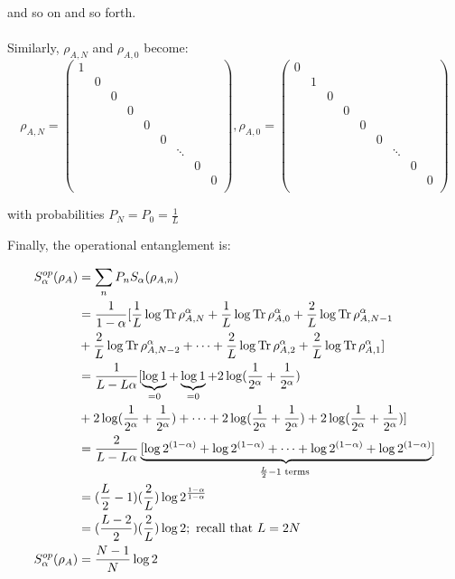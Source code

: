 and so on and so forth. \\
\\
Similarly, $\rho_{A,N}$ and $\rho_{A,0}$ become:
\begin{equation}
\rho_{A,N} = \begin{pmatrix} 
1 \\
& 0 \\
& & 0  \\
& & & 0 \\
& & & &  0 \\
& & & & & 0 \\
& & & & &  & \ddots \\
& & & & & & &  0 \\
& & & & & & & &  0 \\
\end{pmatrix} ,
\rho_{A,0} = \begin{pmatrix} 
0 \\
& 1 \\
& & 0  \\
& & & 0 \\
& & & &  0 \\
& & & & & 0 \\
& & & & &  & \ddots \\
& & & & & & &  0 \\
& & & & & & & &  0 \\
\end{pmatrix} 
\end{equation}

with probabilities $P_{N} = P_{0} = \frac{1}{L}$

Finally, the operational entanglement is:

\begin{align} 
S_{\alpha}^{op}(\rho_A) &= \sum_{n} P_n S_{\alpha}(\rho_{A,n}) \\
&= \frac{1}{1-\alpha}[\frac{1}{L} \log{\operatorname{Tr}{\rho_{A,N}^\alpha}} + \frac{1}{L} \log{\operatorname{Tr}{\rho_{A,0}^\alpha}} + \frac{2}{L} \log{\operatorname{Tr}{\rho_{A,N-1}^\alpha}}  \\
&+ \frac{2}{L} \log{\operatorname{Tr}{\rho_{A,N-2}^\alpha}} + \dots +\frac{2}{L} \log{\operatorname{Tr}{\rho_{A,2}^\alpha}} + \frac{2}{L} \log{\operatorname{Tr}{\rho_{A,1}^\alpha}} ] \\
&= \frac{1}{L-L\alpha}[ \underbrace{\log{1}}_{=0} +  \underbrace{\log{1}}_{=0} + 2 \log({\frac{1}{2^\alpha}+\frac{1}{2^\alpha}}) \\
&+ 2 \log({\frac{1}{2^\alpha}+\frac{1}{2^\alpha}})+ \dots + 2 \log({\frac{1}{2^\alpha}+\frac{1}{2^\alpha}}) + 2 \log({\frac{1}{2^\alpha}+\frac{1}{2^\alpha}}) ] \\
&= \frac{2}{L-L\alpha}\underbrace{[\log{2^{(1-\alpha)}} + \log{2^{(1-\alpha)}} + \dots + \log{2^{(1-\alpha)}} + \log{2^{(1-\alpha)}}}_{\frac{L}{2} - 1 \text{ terms }}] \\
&= (\frac{L}{2}-1)(\frac{2}{L})\log{2^\frac{1-\alpha}{1-\alpha}} \\
&= (\frac{L-2}{2})(\frac{2}{L})\log{2} ; \text{ recall that } L = 2N \\
S_{\alpha}^{op}(\rho_A) &= \frac{N-1}{N}\log{2}
\end{align}

